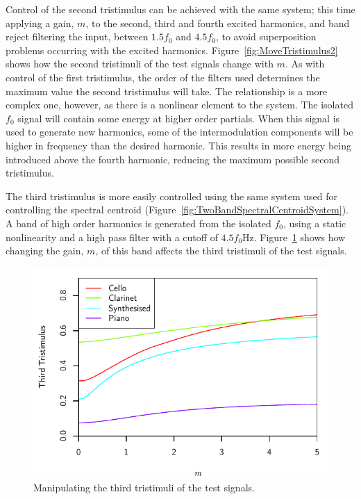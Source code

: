 		Control of the second tristimulus can be achieved with the same system; this time applying a gain, $m$, to
		the second, third and fourth excited harmonics, and band reject filtering the input, between $1.5f_{0}$ and
		$4.5f_{0}$, to avoid superposition problems occurring with the excited harmonics.
		Figure~\ref{fig:MoveTristimulus2} shows how the second tristimuli of the test signals change with $m$. As
		with control of the first tristimulus, the order of the filters used determines the maximum value the
		second tristimulus will take. The relationship is a more complex one, however, as there is a nonlinear
		element to the system.  The isolated $f_{0}$ signal will contain some energy at higher order partials.
		When this signal is used to generate new harmonics, some of the intermodulation components will be higher
		in frequency than the desired harmonic. This results in more energy being introduced above the fourth
		harmonic, reducing the maximum possible second tristimulus.

		The third tristimulus is more easily controlled using the same system used for controlling the spectral
		centroid (Figure~\ref{fig:TwoBandSpectralCentroidSystem}). A band of high order harmonics is generated from
		the isolated $f_{0}$, using a static nonlinearity and a high pass filter with a cutoff of $4.5f_{0}$Hz.
		Figure~\ref{fig:MoveTristimulus3} shows how changing the gain, $m$, of this band affects the third
		tristimuli of the test signals.

		\begin{figure}[h!]
			\centering
			\includegraphics{chapter6/Images/MoveTristimulus3.pdf}
			\caption{Manipulating the third tristimuli of the test signals.}
			\label{fig:MoveTristimulus3}
		\end{figure}

